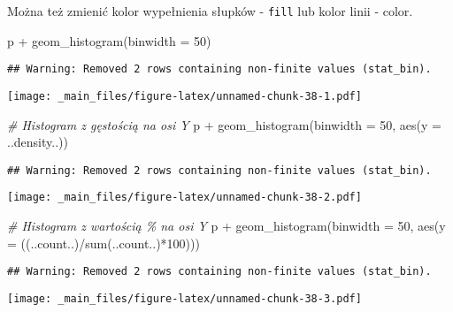 \documentclass[
]{book}
\newenvironment{Shaded}{\begin{snugshade}}{\end{snugshade}}
\newcommand{\AttributeTok}[1]{\textcolor[rgb]{0.77,0.63,0.00}{#1}}
\newcommand{\CommentTok}[1]{\textcolor[rgb]{0.56,0.35,0.01}{\textit{#1}}}
\newcommand{\DecValTok}[1]{\textcolor[rgb]{0.00,0.00,0.81}{#1}}
\newcommand{\FunctionTok}[1]{\textcolor[rgb]{0.00,0.00,0.00}{#1}}
\newcommand{\NormalTok}[1]{#1}
\newcommand{\SpecialCharTok}[1]{\textcolor[rgb]{0.00,0.00,0.00}{#1}}
\begin{document}
Można też zmienić kolor wypełnienia słupków - \texttt{fill} lub kolor linii - color.

\begin{Shaded}
\begin{Highlighting}[]
\NormalTok{p }\SpecialCharTok{+} \FunctionTok{geom\_histogram}\NormalTok{(}\AttributeTok{binwidth =} \DecValTok{50}\NormalTok{)}
\end{Highlighting}
\end{Shaded}

\begin{verbatim}
## Warning: Removed 2 rows containing non-finite values (stat_bin).
\end{verbatim}

\texttt{[image: \_main\_files/figure-latex/unnamed-chunk-38-1.pdf]}

\begin{Shaded}
\begin{Highlighting}[]
\CommentTok{\# Histogram z gęstością na osi Y}
\NormalTok{p }\SpecialCharTok{+} \FunctionTok{geom\_histogram}\NormalTok{(}\AttributeTok{binwidth =} \DecValTok{50}\NormalTok{, }\FunctionTok{aes}\NormalTok{(}\AttributeTok{y =}\NormalTok{ ..density..))}
\end{Highlighting}
\end{Shaded}

\begin{verbatim}
## Warning: Removed 2 rows containing non-finite values (stat_bin).
\end{verbatim}

\texttt{[image: \_main\_files/figure-latex/unnamed-chunk-38-2.pdf]}

\begin{Shaded}
\begin{Highlighting}[]
\CommentTok{\# Histogram z wartością \% na osi Y}
\NormalTok{p }\SpecialCharTok{+} \FunctionTok{geom\_histogram}\NormalTok{(}\AttributeTok{binwidth =} \DecValTok{50}\NormalTok{, }\FunctionTok{aes}\NormalTok{(}\AttributeTok{y =}\NormalTok{ ((..count..)}\SpecialCharTok{/}\FunctionTok{sum}\NormalTok{(..count..)}\SpecialCharTok{*}\DecValTok{100}\NormalTok{)))}
\end{Highlighting}
\end{Shaded}

\begin{verbatim}
## Warning: Removed 2 rows containing non-finite values (stat_bin).
\end{verbatim}

\texttt{[image: \_main\_files/figure-latex/unnamed-chunk-38-3.pdf]}
\end{document}

